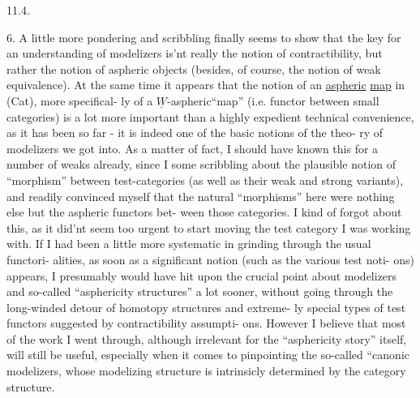 11.4.

6.    A little more pondering and scribbling finally seems to show
that the  key for an understanding of modelizers is'nt really the
notion of contractibility,  but rather the notion of aspheric objects
(besides,  of course,  the notion of weak equivalence).  At the same time
it appears that the notion of an \uline{aspheric} \uline{map} in (Cat),  more specifical-%
ly of a $\underline{W}$-aspheric``map'' (i.e. functor between small categories) is
a lot more important than  a highly expedient technical convenience,  as
it has been so far  -  it is indeed one of the basic notions of the theo-%
ry of modelizers we got into.  As a matter of fact,  I should have known
this for a number of weaks already,  since I  some scribbling about
the plausible notion of ``morphism'' between test-categories (as well as
their weak and strong variants),  and readily convinced myself that the
natural ``morphisms'' here were nothing else but the aspheric functors bet-%
ween those categories.  I kind of forgot about this,  as it did'nt seem
too urgent to start moving  the test category I was working with.  If I 
had been a little more systematic in grinding through the usual functori-%
alities,  as soon as a significant notion (such as the various test noti-%
ons)  appears,  I presumably would have hit upon the crucial point about
modelizers and so-called ``asphericity structures'' a lot sooner,  without
going through the long-winded detour of homotopy structures\hand{,} and  extreme-%
ly special types of test functors suggested by contractibility assumpti-%
ons.  However  I believe that most of the work I went through,  
although irrelevant for the ``asphericity story'' itself,  will still be
useful,  especially when it comes to pinpointing the so-called ``canonic
modelizers,  whose modelizing structure is intrinsicly determined by the
category structure.

